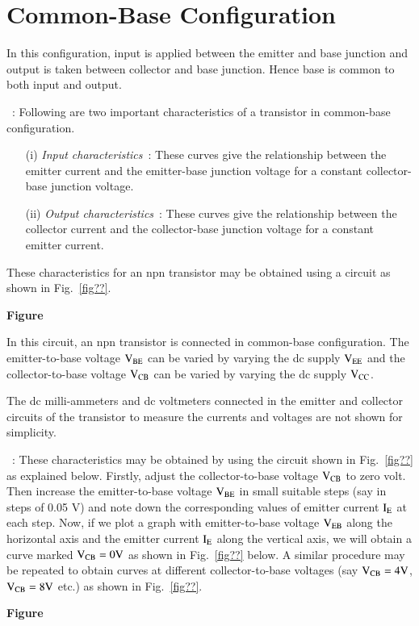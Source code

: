 \section{Common-Base Configuration}\label{sec2.4}

In this configuration, input is applied between the emitter and base junction and output is taken between collector and base junction. Hence base is common to both input and output.

~: Following are two important characteristics of a transistor in common-base configuration.
\begin{itemize}
\item[(i)] {\em Input characteristics}~: These curves give the relationship between the emitter current and the emitter-base junction voltage for a constant collector-base junction voltage.

\item[(ii)] {\em Output characteristics}~: These curves give the relationship between the collector current and the collector-base junction voltage for a constant emitter current.
\end{itemize}

These characteristics for an npn transistor may be obtained using a circuit as shown in Fig.~\ref{fig??}.
\begin{center}
{\bf Figure}
\end{center}

In this circuit, an npn transistor is connected in common-base configuration. The emitter-to-base voltage $\textrm{V}_{\text{BE}}$ can be varied by varying the dc supply $\textrm{V}_{\text{EE}}$ and the collector-to-base voltage $\textrm{V}_{\text{CB}}$ can be varied by varying the dc supply $\textrm{V}_{\text{CC}}$. 

The dc milli-ammeters and dc voltmeters connected in the emitter and collector circuits of the transistor to measure the currents and voltages are not shown for simplicity.

~: These characteristics may be obtained by using the circuit shown in Fig.~\ref{fig??} as explained below. Firstly, adjust the collector-to-base voltage $\textrm{V}_{\text{CB}}$ to zero volt. Then increase the emitter-to-base voltage $\textrm{V}_{\text{BE}}$ in small suitable steps (say in steps of 0.05 V) and note down the corresponding values of emitter current $\textrm{I}_{\textrm{E}}$ at each step. Now, if we plot a graph with emitter-to-base voltage $\textrm{V}_{\text{EB}}$ along the horizontal axis and the emitter current $\textrm{I}_{\textrm{E}}$ along the vertical axis, we will obtain a curve marked $\textrm{V}_{\text{CB}}=0\textrm{V}$ as shown in Fig.~\ref{fig??} below. A similar procedure may be repeated to obtain curves at different collector-to-base voltages (say $\textrm{V}_{\text{CB}}=4\textrm{V}$, $\textrm{V}_{\text{CB}}=8\textrm{V}$ etc.) as shown in Fig.~\ref{fig??}.
\begin{center}
{\bf Figure}
\end{center}

